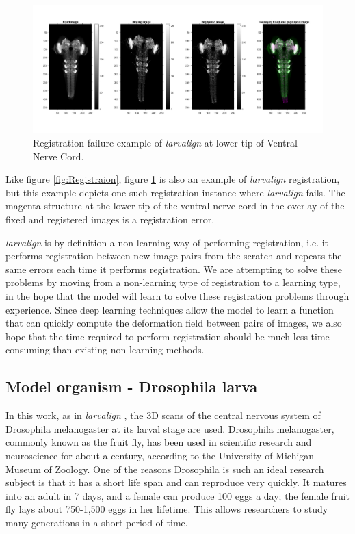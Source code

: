 \documentclass{article}
\begin{document}
	\begin{figure}[H]
		\centering
		\includegraphics[width=\linewidth]{resources/motivation_fig_1.jpg}
		\caption{Registration failure example of \emph{larvalign} at lower tip of Ventral Nerve Cord.}
		\label{fig:Registraion_Failure}
	\end{figure}
	
	 Like figure \ref{fig:Registraion}, figure \ref{fig:Registraion_Failure} is also an example of \emph{larvalign} registration, but this example depicts one such registration instance where \emph{larvalign} fails. The magenta structure at the lower tip of the ventral nerve cord in the overlay of the fixed and registered images is a registration error. \newline
	
	\emph{larvalign} is by definition a non-learning way of performing registration, i.e. it performs registration between new image pairs from the scratch and repeats the same errors each time it performs registration. We are attempting to solve these problems by moving from a non-learning type of registration to a learning type, in the hope that the model will learn to solve these registration problems through experience. Since deep learning techniques allow the model to learn a function that can quickly compute the deformation field between pairs of images, we also hope that the time required to perform registration should be much less time consuming than existing non-learning methods.
	
	\subsection{Model organism - Drosophila larva}
	
	In this work, as in \emph{larvalign} \cite{Mu_2018}, the 3D scans of the central nervous system of Drosophila melanogaster at its larval stage are used. Drosophila melanogaster, commonly known as the fruit fly, has been used in scientific research and neuroscience for about a century, according to the University of Michigan Museum of Zoology. One of the reasons Drosophila is such an ideal research subject is that it has a short life span and can reproduce very quickly. It matures into an adult in 7 days, and a female can produce 100 eggs a day; the female fruit fly lays about 750-1,500 eggs in her lifetime. This allows researchers to study many generations in a short period of time. \newline
	
\end{document}
